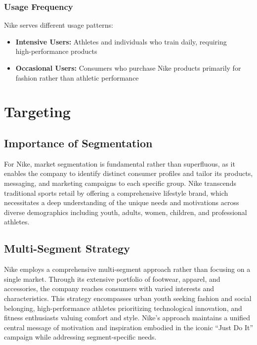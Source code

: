 \documentclass[letterpaper, 12pt]{article}
\begin{document}
\subsubsection{Usage Frequency}
Nike serves different usage patterns:
\begin{itemize}
    \item \textbf{Intensive Users:} Athletes and individuals who train daily, requiring \\ high-performance products
    \item \textbf{Occasional Users:} Consumers who purchase Nike products primarily for fashion rather than athletic performance
\end{itemize}

\section{Targeting}

\subsection{Importance of Segmentation}

For Nike, market segmentation is fundamental rather than superfluous, as it enables the company to identify distinct consumer profiles and tailor its products, messaging, and marketing campaigns to each specific group. Nike transcends traditional sports retail by offering a comprehensive lifestyle brand, which necessitates a deep understanding of the unique needs and motivations across diverse demographics including youth, adults, women, children, and professional athletes.

\subsection{Multi-Segment Strategy}

Nike employs a comprehensive multi-segment approach rather than focusing on a single market. Through its extensive portfolio of footwear, apparel, and accessories, the company reaches consumers with varied interests and characteristics. This strategy encompasses urban youth seeking fashion and social belonging, high-performance athletes prioritizing technological innovation, and fitness enthusiasts valuing comfort and style. Nike's approach maintains a unified central message of motivation and inspiration embodied in the iconic ``Just Do It'' campaign while addressing segment-specific needs.
\end{document}
